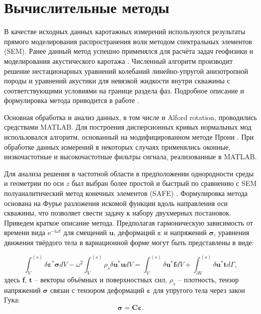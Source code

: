 \documentclass[a4paper,11pt]{article}
\newcommand{\ii}{\mathrm{i}}
\begin{document}

\section{Вычислительные методы}
В качестве исходных данных каротажных измерений используются результаты прямого моделирования распространения волн методом спектральных элементов (SEM). Ранее данный метод успешно применялся для расчёта задач геофизики \cite{Komatitsch1999} и моделирования акустического каротажа \cite{Charara2011}. Численный алгоритм производит решение нестационарных уравнений колебаний линейно-упругой анизотропной породы и уравнений акустики для невязкой жидкости внутри скважины с соответствующими условиями на границе раздела фаз. Подробное описание и формулировка метода приводится в работе \cite{Komatitsch1999}.

Основная обработка и анализ данных, в том числе и Alford rotation, проводились средствами MATLAB. Для построения дисперсионных кривых нормальных мод использовался алгоритм, основанный на модифицированном методе Прони \cite{Ekstrom1995}. При обработке данных измерений в некоторых случаях применялись оконные, низкочастотные и высокочастотные фильтры сигнала, реализованные в MATLAB. 

Для анализа решения в частотной области в предположении однородности среды и геометрии по оси $z$ был выбран более простой и быстрый по сравнению с SEM полуаналитический метод конечных элементов (SAFE) \cite{Bartoli2006}. Формулировка метода основана на Фурье разложения искомой функции вдоль направления оси скважины, что позволяет свести задачу к набору двухмерных постановок. Приведем краткое описание метода. Предполагая гармоническую зависимость от времени вида $\mathrm{e}^{-\ii\omega t}$ для смещений $\mathbf{u}$, деформаций $\boldsymbol{\varepsilon}$ и напряжений $\boldsymbol{\sigma}$, уравнения движения твёрдого тела в вариационной форме могут быть представлены в виде:

\begin{equation}
\int_{V}^{(s)}\delta \boldsymbol{\varepsilon}^* \boldsymbol{\sigma} dV - \omega^2 \int_{V}^{(s)} \rho_s \delta \mathbf{u}^*\mathbf{u}dV = \int_{V}^{(s)}\delta \mathbf{u}^* \mathbf{f} dV + \int_{\partial V}^{(s)}\delta \mathbf{u}^* \mathbf{t} d\Gamma, \label{var_eq_solid}
\end{equation}
здесь $\mathbf{f}$, $\mathbf{t}$ -- векторы объёмных и поверхностных сил, $\rho_s$ -- плотность, тензор напряжений $\boldsymbol{\sigma}$ связан с тензором деформаций $\boldsymbol{\varepsilon}$ для упругого тела через закон Гука:
$$
\boldsymbol{\sigma} = \mathbf{C}\boldsymbol{\varepsilon}.
$$
\end{document}
